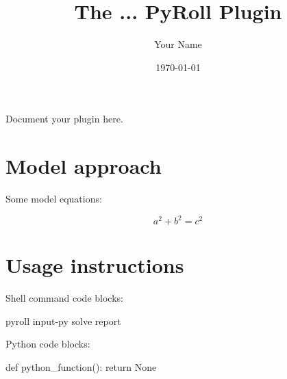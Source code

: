 \documentclass[11pt]{PyRollDocs}
\begin{document}
    \title{The ... PyRoll Plugin}
    \author{Your Name}
    \date{\today}

    \maketitle

    Document your plugin here.


    \section{Model approach}\label{sec:model-approach}

    Some model equations:

    \[
        a^2 + b^2 = c^2
    \]


    \section{Usage instructions}\label{sec:usage-instructions}

    Shell command code blocks:

    \begin{shell}[gobble=8] %
        pyroll input-py solve report
    \end{shell}

    Python code blocks:

    \begin{python}[gobble=8] %
        def python_function():
        return None
    \end{python}
\end{document}
